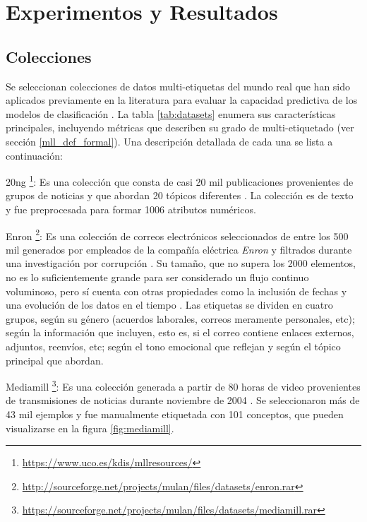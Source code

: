 \chapter{Experimentos y Resultados}

\section{Colecciones}


Se seleccionan colecciones de datos multi-etiquetas del mundo real que han sido
aplicados previamente en la literatura para evaluar la capacidad predictiva de
los modelos de clasificación \cite{osojnik_multi-label_2017, read_scalable_2012,
	buyukcakir_novel_2018}. La tabla \ref{tab:datasets} enumera sus características
principales, incluyendo métricas que describen su grado de multi-etiquetado (ver
sección \ref{mll_def_formal}). Una descripción detallada de cada una se lista a
continuación:

\begin{description}

	\item{20ng} \footnote{\url{https://www.uco.es/kdis/mllresources/}}: Es una
	      colección que consta de casi 20 mil publicaciones provenientes de grupos de
	      noticias y que abordan 20 tópicos diferentes \cite{lang_newsweeder_1995}.
	      La colección es de texto y fue preprocesada para formar 1006 atributos
	      numéricos.

	\item{Enron}
	      \footnote{\url{http://sourceforge.net/projects/mulan/files/datasets/enron.rar}}:
	      Es una colección de correos electrónicos seleccionados de entre los 500 mil
	      generados por empleados de la compañía eléctrica \textit{Enron} y filtrados
	      durante una investigación por corrupción \cite{hutchison_enron_2004}. Su
	      tamaño, que no supera los 2000 elementos, no es lo suficientemente grande
	      para ser considerado un flujo continuo voluminoso, pero sí cuenta con otras
	      propiedades como la inclusión de fechas y una evolución de los datos en el
	      tiempo \cite{read_scalable_2012}. Las etiquetas se dividen en cuatro
	      grupos, según su género (acuerdos laborales, correos meramente personales,
	      etc); según la información que incluyen, esto es, si el correo contiene
	      enlaces externos, adjuntos, reenvíos, etc; según el tono emocional que
	      reflejan y según el tópico principal que abordan.

	\item{Mediamill}
	      \footnote{\url{https://sourceforge.net/projects/mulan/files/datasets/mediamill.rar}}:
	      Es una colección generada a partir de 80 horas de video provenientes de
	      transmisiones de noticias durante noviembre de 2004
	      \cite{snoek_challenge_2006}. Se seleccionaron más de 43 mil ejemplos y fue
	      manualmente etiquetada con 101 conceptos, que pueden visualizarse en la
	      figura \ref{fig:mediamill}.

\end{description}

